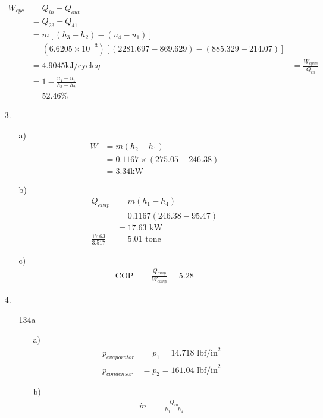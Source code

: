\documentclass{article}
\begin{document}
\begin{itemize}
\begin{align*}
        W_{cyc}&=Q_{in}-Q_{out}\\
        &=Q_{23}-Q_{41}\\
        &=m[(h_3-h_2)-(u_4-u_1)]\\
        &=(6.6205\times 10^{-3})[(2281.697-869.629)-(885.329-214.07)]\\
        &=4.9045 \text{kJ/cycle}
        \eta &=\frac{W_{cycle}}{Q_{in}}\\
        &=1-\frac{u_4-u_1}{h_3-h_2}\\
        &=52.46\%
    \end{align*}
    \item [3.]
    \begin{itemize}
        \item [a)]
        \begin{align*}
            W&=\dot{m}(h_2-h_1)\\
            &=0.1167\times (275.05-246.38)\\
            &=3.34 \text{kW}
        \end{align*}
        \item [b)]
        \begin{align*}
            Q_{evap}&=\dot{m}(h_1-h_4)\\
            &=0.1167(246.38-95.47)\\
            &=17.63\text{ kW}\\
            \frac{17.63}{3.517}&=5.01 \text{ tone}
        \end{align*}
        \item [c)]
        \begin{align*}
            \text{COP}&=\frac{Q_{evap}}{W_{comp}}=5.28
        \end{align*}
    \end{itemize}
    \item [4.]\
    \begin{itemize}
        \item [134a]
        \begin{itemize}
            \item [a)]
            \begin{align*}
                p_{evaporator}&=p_1=14.718 \text{ lbf/in}^2\\
                p_{condensor}&=p_2=161.04 \text{ lbf/in}^2
            \end{align*}
            \item [b)]
            \begin{align*}
                \dot{m}&=\frac{Q_{in}}{h_1-h_4}\\

\end{align*}
\end{itemize}
\end{itemize}
\end{itemize}
\end{document}
